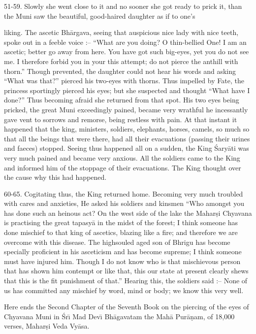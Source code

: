51-59. Slowly she went close to it and no sooner she got ready to prick it, than the Muni saw the beautiful, good-haired daughter as if to one's

liking. The ascetic Bh\=argava, seeing that auspicious nice lady with nice teeth, spoke out in a feeble voice :-- ``What are you doing? O thin-bellied One! I am an ascetic; better go away from here. You have got such big-eyes, yet you do not see me. I therefore forbid you in your this attempt; do not pierce the anthill with thorn.'' Though prevented, the daughter could not hear his words and asking ``What was that?'' pierced his two-eyes with thorns. Thus impelled by Fate, the princess sportingly pierced his eyes; but she suspected and thought ``What have I done?'' Thus becoming afraid she returned from that spot. His two eyes being pricked, the great Muni exceedingly pained, became very wrathful he incessantly gave vent to sorrows and remorse, being restless with pain. At that instant it happened that the king, ministers, soldiers, elephants, horses, camels, so much so that all the beings that were there, had all their evacuations (passing their urines and faeces) stopped. Seeing thus happened all on a sudden, the King \'Sary\=ati was very much pained and became very anxious. All the soldiers came to the King and informed him of the stoppage of their evacuations. The King thought over the cause why this had happened.

60-65. Cogitating thus, the King returned home. Becoming very much troubled with cares and anxieties, He asked his soldiers and kinsmen ``Who amongst you has done such an heinous act? On the west side of the lake the Mahar\d{s}i Chyavana is practising the great tapasy\=a in the midst of the forest; I think someone has done mischief to that king of ascetics, blazing like a fire; and therefore we are overcome with this disease. The highsouled aged son of Bhrigu has become specially proficient in his asceticism and has become supreme; I think someone must have injured him. Though I do not know who is that mischievous person that has shown him contempt or like that, this our state at present clearly shews that this is the fit punishment of that.'' Hearing this, the soldiers said :-- None of us has committed any mischief by word, mind or body; we know this very well.

Here ends the Second Chapter of the Seventh Book on the piercing of the eyes of Chyavana Muni in \'Sr\={\i} Mad Dev\={\i} Bh\=agavatam the Mah\=a Pur\=a\d{n}am, of 18,000 verses, Mahar\d{s}i Veda Vy\=asa.



